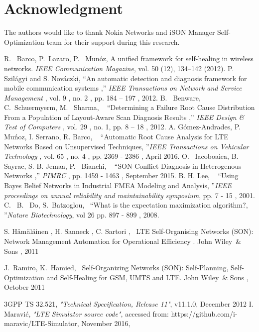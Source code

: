 \documentclass[conference]{IEEEtran}
\begin{document}
\section*{Acknowledgment}
The authors would like to thank Nokia Networks and iSON Manager Self-Optimization team for their support during this research.
%
%
%
\begin{thebibliography}{11}
 R.~ Barco, P.~Lazaro, P.~ Mun\'oz, A unified framework for self-healing in wireless
networks. \emph{IEEE Communication Magazine}, vol. 50 (12), 134–142 (2012).
P.~ Szil\'agyi and S. Nov\'aczki, “An automatic detection and diagnosis framework for mobile communication systems ,”\emph{ IEEE Transactions on Network and Service Management} , vol. 9 , no. 2 , pp. 184 – 197 ,  2012.
B.~ Benware, C.~Schuermyerm, M.~ Sharma, ~ “Determining a Failure Root Cause Distribution From a Population of Layout-Aware Scan Diagnosis Results ,”\emph{ IEEE Design \& Test of Computers} , vol. 29 , no. 1,  pp. 8 – 18 , 2012.
A. G\'omez-Andrades, P. Mu\'noz, I. Serrano, R. Barco, ~ “Automatic Root Cause Analysis for LTE Networks
Based on Unsupervised Techniques, ”\emph{IEEE Transactions on Vehicular Technology} , vol. 65 , no. 4 , pp. 2369 - 2386 , April 2016.
O.~ Iacoboaiea, B.~ Sayrac, S. B. Jemaa, P.~ Bianchi, ~ “SON Conflict Diagnosis in Heterogenous Networks ,”\emph{ PIMRC} ,  pp. 1459 - 1463 , September 2015.
B. H. Lee, ~ “Using Bayes Belief Networks in Industrial FMEA Modeling and Analysis, ”\emph{IEEE proceedings on annual reliability and maintainability symposium}, pp. 7 - 15 ,  2001.
C.~ B.~ Do, S.~Batzoglou,~ “What is the expectation maximization algorithm?, ”\emph{Nature Biotechnology}, vol 26 pp. 897 - 899 ,  2008.

S. H\"am\"al\"ainen , H. Sanneck , C. Sartori ,~ LTE Self-Organising Networks (SON): Network Management Automation for Operational Efficiency . John Wiley~\& Sons , 2011

J.~Ramiro, K.~Hamied,~ Self-Organizing Networks (SON): Self-Planning, Self-Optimization and Self-Healing for GSM, UMTS and LTE. John Wiley~\& Sons , October 2011

3GPP TS 32.521, \emph{"Technical Specification, Release 11"},
v11.1.0, December 2012 
I. Maravi\'c, \emph{"LTE Simulator source code"}, accessed
from: https://github.com/i-maravic/LTE-Simulator, November 2016, 

\end{thebibliography}
\end{document}
